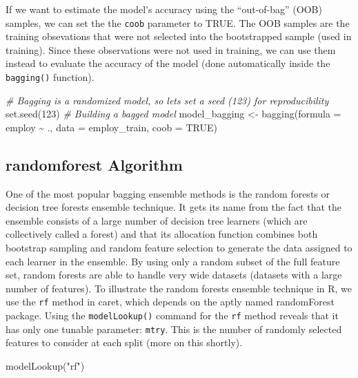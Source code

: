 \documentclass[
]{book}
\newenvironment{Shaded}{\begin{snugshade}}{\end{snugshade}}
\newcommand{\AttributeTok}[1]{\textcolor[rgb]{0.77,0.63,0.00}{#1}}
\newcommand{\CommentTok}[1]{\textcolor[rgb]{0.56,0.35,0.01}{\textit{#1}}}
\newcommand{\ConstantTok}[1]{\textcolor[rgb]{0.00,0.00,0.00}{#1}}
\newcommand{\DecValTok}[1]{\textcolor[rgb]{0.00,0.00,0.81}{#1}}
\newcommand{\FunctionTok}[1]{\textcolor[rgb]{0.00,0.00,0.00}{#1}}
\newcommand{\NormalTok}[1]{#1}
\newcommand{\OtherTok}[1]{\textcolor[rgb]{0.56,0.35,0.01}{#1}}
\newcommand{\SpecialCharTok}[1]{\textcolor[rgb]{0.00,0.00,0.00}{#1}}
\newcommand{\StringTok}[1]{\textcolor[rgb]{0.31,0.60,0.02}{#1}}
\begin{document}
If we want to estimate the model's accuracy using the ``out-of-bag'' (OOB) samples, we can set the the \texttt{coob} parameter to TRUE. The OOB samples are the training obsevations that were not selected into the bootstrapped sample (used in training). Since these observations were not used in training, we can use them instead to evaluate the accuracy of the model (done automatically inside the \texttt{bagging()} function).

\begin{Shaded}
\begin{Highlighting}[]
\CommentTok{\# Bagging is a randomized model, so let\textquotesingle{}s set a seed (123) for reproducibility}
\FunctionTok{set.seed}\NormalTok{(}\DecValTok{123}\NormalTok{)}
\CommentTok{\# Building a bagged model}
\NormalTok{model\_bagging }\OtherTok{\textless{}{-}} \FunctionTok{bagging}\NormalTok{(}\AttributeTok{formula =}\NormalTok{ employ }\SpecialCharTok{\textasciitilde{}}\NormalTok{ ., }
                         \AttributeTok{data =}\NormalTok{ employ\_train,}
                         \AttributeTok{coob =} \ConstantTok{TRUE}\NormalTok{)}
\end{Highlighting}
\end{Shaded}

\hypertarget{randomforest-algorithm}{%
\subsection{randomforest Algorithm}\label{randomforest-algorithm}}

One of the most popular bagging ensemble methods is the random forests or decision
tree forests ensemble technique. It gets its name from the fact that the ensemble consists of a large number of decision tree learners (which are collectively called a forest) and that its allocation function combines both bootstrap sampling and random feature selection to generate the data assigned to each learner in the ensemble. By using only a random subset of the full feature set, random forests are able to handle very wide datasets (datasets with a large number of features).
To illustrate the random forests ensemble technique in R, we use the \texttt{rf} method
in caret, which depends on the aptly named randomForest package. Using the
\texttt{modelLookup()} command for the \texttt{rf} method reveals that it has only one tunable
parameter: \texttt{mtry}. This is the number of randomly selected features to consider at each split (more on this shortly).

\begin{Shaded}
\begin{Highlighting}[]
\FunctionTok{modelLookup}\NormalTok{(}\StringTok{"rf"}\NormalTok{)}
\end{Highlighting}
\end{Shaded}
\end{document}
